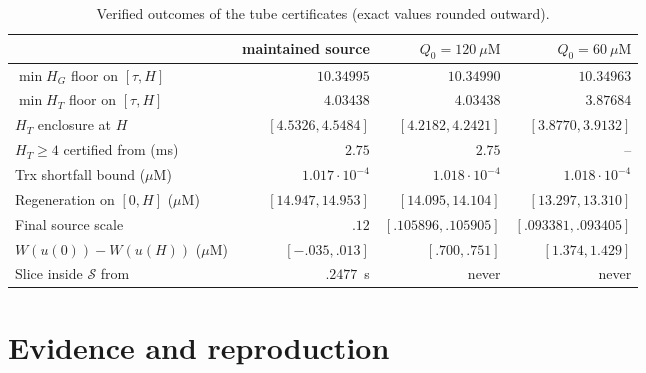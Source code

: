 \documentclass[11pt,a4paper]{article}
\theoremstyle{plain}
\theoremstyle{definition}
\theoremstyle{remark}
\newcommand{\uM}{\ensuremath{\mu\mathrm{M}}}
\newcommand{\HG}{H_G}
\newcommand{\HT}{H_T}
\newcommand{\SSS}{\mathcal S}
\begin{document}
\begin{table}[ht]\centering\small
\caption{Verified outcomes of the tube certificates (exact values rounded
outward).}\label{tab:tube}
\begin{tabular}{lrrr}\toprule
&maintained source&$Q_0=120~\uM$&$Q_0=60~\uM$\\\midrule
$\min\HG$ floor on $[\tau,H]$&$10.34995$&$10.34990$&$10.34963$\\
$\min\HT$ floor on $[\tau,H]$&$4.03438$&$4.03438$&$3.87684$\\
$\HT$ enclosure at $H$&$[4.5326,4.5484]$&$[4.2182,4.2421]$&$[3.8770,3.9132]$\\
$\HT\ge4$ certified from (ms)&$2.75$&$2.75$&--\\
Trx shortfall bound (\uM)&$1.017\cdot10^{-4}$&$1.018\cdot10^{-4}$&$1.018\cdot10^{-4}$\\
Regeneration on $[0,H]$ (\uM)&$[14.947,14.953]$&$[14.095,14.104]$&$[13.297,13.310]$\\
Final source scale&$.12$&$[.105896,.105905]$&$[.093381,.093405]$\\
$W(u(0))-W(u(H))$ (\uM)&$[-.035,.013]$&$[.700,.751]$&$[1.374,1.429]$\\
Slice inside $\SSS$ from&$.2477$~s&never&never\\
\bottomrule\end{tabular}
\end{table}

\section{Evidence and reproduction}\label{sec:repro}
\end{document}
